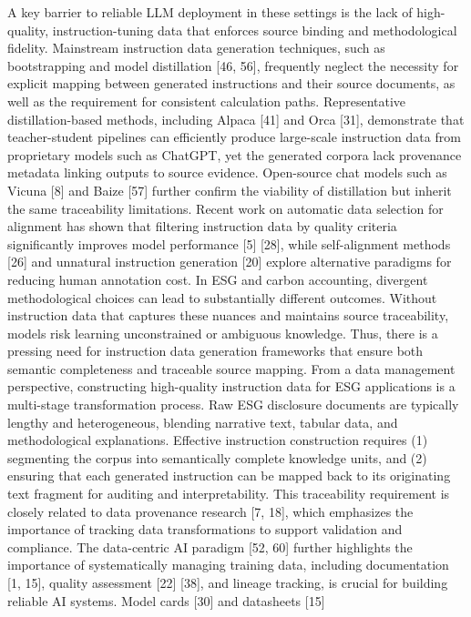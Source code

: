 \documentclass[9pt,twocolumn]{extarticle}
\begin{document}
A key barrier to reliable LLM deployment in these settings is the lack
of high-quality, instruction-tuning data that enforces source binding
and methodological fidelity. Mainstream instruction data generation
techniques, such as bootstrapping and model distillation
[46, 56], frequently neglect
the necessity for explicit mapping between generated instructions and
their source documents, as well as the requirement for consistent
calculation paths. Representative distillation-based methods, including
Alpaca [41] and Orca [31],
demonstrate that teacher-student pipelines can efficiently produce
large-scale instruction data from proprietary models such as ChatGPT,
yet the generated corpora lack provenance metadata linking outputs to
source evidence. Open-source chat models such as Vicuna
[8] and Baize [57] further
confirm the viability of distillation but inherit the same traceability
limitations. Recent work on automatic data selection for alignment has
shown that filtering instruction data by quality criteria significantly
improves model performance [5]
[28], while self-alignment methods
[26] and unnatural instruction generation
[20] explore alternative paradigms for reducing
human annotation cost. In ESG and carbon accounting, divergent
methodological choices can lead to substantially different outcomes.
Without instruction data that captures these nuances and maintains
source traceability, models risk learning unconstrained or ambiguous
knowledge. Thus, there is a pressing need for instruction data
generation frameworks that ensure both semantic completeness and
traceable source mapping.
From a data management perspective, constructing high-quality
instruction data for ESG applications is a multi-stage transformation
process. Raw ESG disclosure documents are typically lengthy and
heterogeneous, blending narrative text, tabular data, and methodological
explanations. Effective instruction construction requires (1) segmenting
the corpus into semantically complete knowledge units, and (2) ensuring
that each generated instruction can be mapped back to its originating
text fragment for auditing and interpretability. This traceability
requirement is closely related to data provenance research
[7, 18], which emphasizes the
importance of tracking data transformations to support validation and
compliance. The data-centric AI paradigm [52, 60] further highlights the importance of
systematically managing training data, including documentation
[1, 15], quality assessment
[22] [38], and lineage
tracking, is crucial for building reliable AI systems. Model cards
[30] and datasheets [15]
\end{document}
